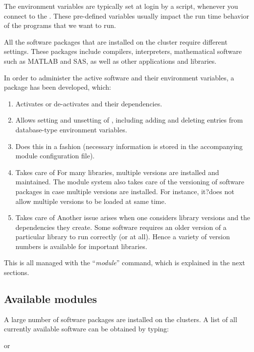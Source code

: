 The environment variables are typically set at login by a script, whenever you
connect to the \hpc. These pre-defined variables usually impact the run time
behavior of the programs that we want to run.

All the software packages that are installed on the \hpc cluster require
different settings. These packages include compilers, interpreters,
mathematical software such as MATLAB and SAS, as well as other applications and
libraries.

In order to administer the active software and their environment variables, a
 package has been developed, which:

\begin{enumerate}
\item  Activates or de-activates  and their dependencies.
\item  Allows setting and unsetting of , including adding and deleting entries from database-type environment variables.
\item  Does this in a  fashion (necessary information is stored in the accompanying module configuration file).
\item  Takes care of For many libraries, multiple versions are installed and maintained. The module system also takes care of the versioning of software packages in case multiple versions are installed. For instance, it?does not allow multiple versions to be loaded at same time.
\item  Takes care of Another issue arises when one considers library versions and the dependencies they create. Some software requires an older version of a particular library to run correctly (or at all). Hence a variety of version numbers is available for important libraries.
\end{enumerate}

This is all managed with the ``\emph{module}'' command, which is explained in
the next sections.

\subsection{Available modules}

A large number of software packages are installed on the \hpc clusters. A
list of all currently available software can be obtained by typing:

\begin{prompt}
\end{prompt}
or
\begin{prompt}
\end{prompt}

